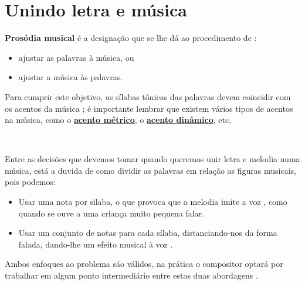 \section{Unindo letra e música}
\label{sec:ProsodiaMusical}
\textbf{Prosódia musical} é a designação que se lhe dá ao procedimento de \cite[pp. 336]{medteoria}:
\begin{itemize}
\item ajustar as palavras à música, ou 
\item ajustar a música às palavras.
\end{itemize}

Para cumprir este objetivo, 
as sílabas tônicas das palavras devem coincidir com os acentos da música \cite[pp. 149]{medteoria} \cite[pp. 60]{howard1991aprendendo};
é importante lembrar que existem vários tipos de acentos na música,
como o \hyperref[def:acentometrico]{\textbf{acento métrico}}, 
o \hyperref[def:acentodinamico]{\textbf{acento dinâmico}}, etc.

~

Entre as decisões que devemos tomar quando queremos unir letra e melodia numa música, 
está a duvida de como dividir as palavras em relação as figuras musicais, pois podemos:
\begin{itemize}
\item Usar uma nota por silaba, 
o que provoca que a melodia imite a voz \cite[pp. 60]{howard1991aprendendo},
como quando se ouve a uma criança muito pequena falar.
\item Usar um conjunto de notas para cada sílaba, 
distanciando-nos da forma falada, dando-lhe um efeito musical à voz \cite[pp. 60]{howard1991aprendendo}. 
\end{itemize}
Ambos enfoques ao problema são válidos, 
na prática o compositor optará por trabalhar em algum ponto intermediário
entre estas duas abordagens \cite[pp. 60]{howard1991aprendendo}.



